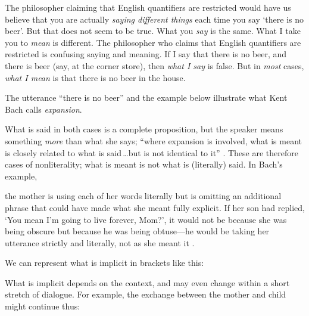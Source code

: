 \documentclass[11pt]{article}
\newenvironment{squote}{%
\begin{spacing}{1}
       	\begin{list}{}{%
\setlength{\labelwidth}{0pt}%
\rightmargin\leftmargin%
}
\item\relax
}{%
\end{list}%
\end{spacing}
}
\begin{document}
\begin{spacing}{1.25}





The philosopher claiming that English quantifiers are restricted would
have us believe that you are actually {\em saying different things}
each time you say `there is no beer'.  But that does not seem to be
true.  What you {\em say} is the same.  What I take you to {\em mean}
is different.  The philosopher who claims that English quantifiers are
restricted is confusing saying and meaning.  If I say that there is no
beer, and there is beer (say, at the corner store), then {\em what I
  say} is false.  But in {\em most} cases, {\em what I mean} is that
there is no beer in the house.

The utterance ``there is no beer'' and the example below illustrate
what Kent Bach calls {\em expansion}.


What is said in both cases is a complete proposition, but the speaker
means something {\em more} than what she says; ``where expansion is
involved, what is meant is closely related to what is said\,\ldots but
is not identical to it'' \citep{bach1994}.  These are therefore cases
of nonliterality; what is meant is not what is (literally) said.  In
Bach's example,

\begin{squote}
the mother is using each of her words literally but is omitting an
additional phrase that could have made what she meant fully explicit.
If her son had replied, `You mean I'm going to live forever, Mom?', it
would not be because she was being obscure but because he was being
obtuse---he would be taking her utterance strictly and literally, not
as she meant it \citeyearpar{bach1994}.
\end{squote}

We can represent what is implicit in brackets like this:


\noindent What is implicit depends on the context, and may even change
within a short stretch of dialogue.  For example, the exchange between
the mother and child might continue thus:


\end{spacing}
\end{document}
